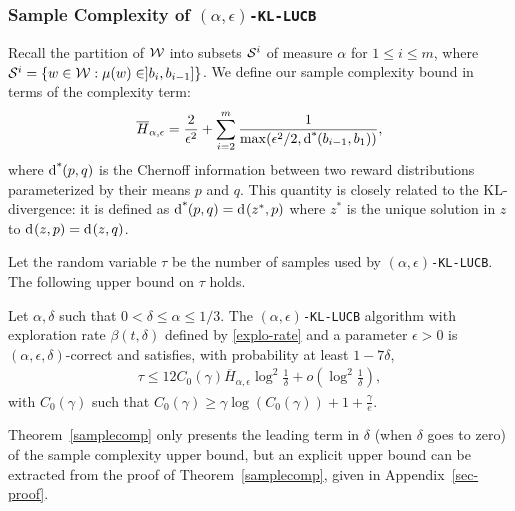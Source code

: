 \subsubsection{Sample Complexity of \texttt{$(\alpha,\epsilon)$-KL-LUCB}}

Recall the partition of $\mathcal{W}$ into subsets $\mathcal{S}^{i}$ of measure
$\alpha$ for $1 \le i \le m$,
where $\ArmGrp{i} = \Set{\arm \in \Arms:\ArmMean(\arm) \in ]b_i,b_{i-1}]}$.
We define our sample complexity bound in terms of the complexity
term:
%
\vspace{-15pt}
%
\begin{align}
\overline{H}_{\alpha,\epsilon} =
    \frac{ 2 }{ \epsilon^2 } +
    \sum_{ i = 2 }^{m}\frac{1}{
    \max(\epsilon^2/2,\operatorname{d^*}\hspace{-.2em}\left( b_{i-1}, b_1 \right))},
\end{align}
%
%
where $\operatorname{d^*}\hspace{-.2em}\left( p, q \right)$ is the Chernoff information
between two reward distributions parameterized by their means $p$ and $q$. This %
quantity is closely related to the KL-divergence: it is defined as 
$\operatorname{d^*}\hspace{-.2em}\left( p, q \right)=\operatorname{d}\hspace{-.1em}\left( z^*, p \right)$ where $z^*$ is the unique solution in $z$ to $\operatorname{d}\hspace{-.1em}\left( z, p \right) = \operatorname{d}\hspace{-.1em}\left( z, q \right)$. 

Let the random variable $\tau$ be the number of samples used by
\texttt{$(\alpha,\epsilon)$-KL-LUCB}. The following upper bound on $\tau$ holds.

\begin{theorem}\label{samplecomp}
Let $\alpha,\delta$ such that $0<\delta \leq \alpha \leq 1/3$.
The \texttt{$(\alpha,\epsilon)$-KL-LUCB} algorithm with exploration rate
$\beta(t,\delta)$ defined by \eqref{explo-rate} and a parameter $\epsilon>0$
is $(\alpha,\epsilon,\delta)$-correct and satisfies, with probability at least $1-7\delta$,
%
\vspace{-10pt}
%
\begin{align*}
    \tau \le 12 C_0(\gamma) \overline{H}_{\alpha,\epsilon}
    \log^2 \frac{1}{\delta} + o\left( \log^2 \frac{1}{\delta} \right),
\end{align*}
%
%
with $C_0(\gamma)$ such that
$C_0(\gamma) \ge \gamma \log(C_0(\gamma)) + 1 + \frac{\gamma}{e}$.
\end{theorem}

Theorem~\ref{samplecomp} only presents the leading term in $\delta$ (when $\delta$ goes to zero) of the sample complexity upper bound, but an explicit upper bound can be extracted from the proof of Theorem~\ref{samplecomp}, given in Appendix~\ref{sec-proof}.  

